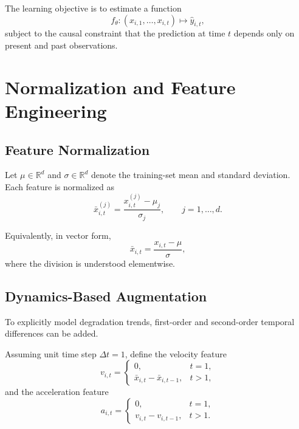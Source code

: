 \documentclass[11pt,a4paper]{article}
\begin{document}
The learning objective is to estimate a function
\begin{equation}
    f_\theta : (x_{i,1},\dots,x_{i,t}) \mapsto \hat{y}_{i,t},
\end{equation}
subject to the causal constraint that the prediction at time $t$ depends only on present and past observations.

\section{Normalization and Feature Engineering}
\subsection{Feature Normalization}
Let $\mu \in \mathbb{R}^{d}$ and $\sigma \in \mathbb{R}^{d}$ denote the training-set mean and standard deviation. Each feature is normalized as
\begin{equation}
    \bar{x}_{i,t}^{(j)} = \frac{x_{i,t}^{(j)} - \mu_j}{\sigma_j},
    \qquad j = 1,\dots,d.
\end{equation}

Equivalently, in vector form,
\begin{equation}
    \bar{x}_{i,t} = \frac{x_{i,t} - \mu}{\sigma},
\end{equation}
where the division is understood elementwise.

\subsection{Dynamics-Based Augmentation}
To explicitly model degradation trends, first-order and second-order temporal differences can be added.

Assuming unit time step $\Delta t = 1$, define the velocity feature
\begin{equation}
    v_{i,t} =
    \begin{cases}
        0, & t = 1,\\
        \bar{x}_{i,t} - \bar{x}_{i,t-1}, & t > 1,
    \end{cases}
\end{equation}
and the acceleration feature
\begin{equation}
    a_{i,t} =
    \begin{cases}
        0, & t = 1,\\
        v_{i,t} - v_{i,t-1}, & t > 1.
    \end{cases}
\end{equation}
\end{document}
